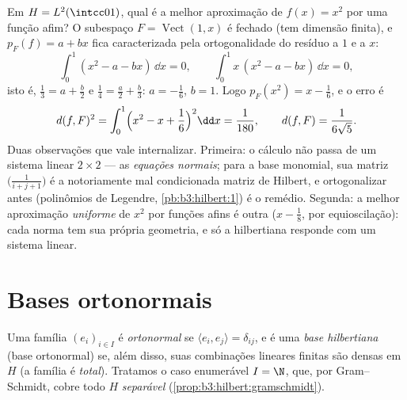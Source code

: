 \begin{example}
\label{ex:b3:hilbert:projectionexample}
Em $H = L^2(\intcc01)$, qual é a melhor aproximação de $f(x) = x^2$ por uma função afim? O
subespaço $F =
\operatorname{Vect}(1, x)$ é fechado (tem dimensão finita), e $p_F(f) = a + bx$ fica
caracterizada pela ortogonalidade do resíduo a $1$ e a $x$:
\[
\int_0^1(x^2 - a - bx)\,\dd x = 0,
\qquad
\int_0^1x\,(x^2 - a - bx)\,\dd x = 0,
\]
isto é, $\frac13 = a + \frac b2$ e $\frac14 = \frac a2 +
\frac b3$: $a = -\frac16$, $b = 1$. Logo $p_F(x^2) = x -
\frac16$, e o erro é
\[
d(f, F)^2 = \int_0^1\Bigl(x^2 - x + \frac16\Bigr)^2\dd x =
\frac1{180},
\qquad d(f, F) = \frac1{6\sqrt5} .
\]
Duas observações que vale internalizar. Primeira: o cálculo não passa
de um sistema linear $2\times2$ --- as \emph{equações normais}; para a base
monomial, sua matriz $\bigl(\frac1{i+j+1}\bigr)$ é a notoriamente mal condicionada matriz de
Hilbert, e ortogonalizar antes (polinômios de Legendre,
\cref{pb:b3:hilbert:1}) é o remédio. Segunda: a melhor aproximação
\emph{uniforme} de $x^2$ por funções afins é outra ($x - \frac18$, por
equioscilação): cada norma tem sua própria geometria, e só a
hilbertiana responde com um sistema linear.
\end{example}

\section{Bases ortonormais}

\begin{definition}\label{def:b3:hilbert:onb}
Uma família $(e_i)_{i\in I}$ é \emph{ortonormal} se $\langle
e_i, e_j\rangle = \delta_{ij}$, e é uma \emph{base
hilbertiana} (base ortonormal) se, além disso,
suas combinações lineares finitas são densas em $H$ (a família é
\emph{total}). Tratamos o caso enumerável $I = \N$, que, por
Gram--Schmidt, cobre todo $H$ \emph{separável}
(\cref{prop:b3:hilbert:gramschmidt}).
\end{definition}

